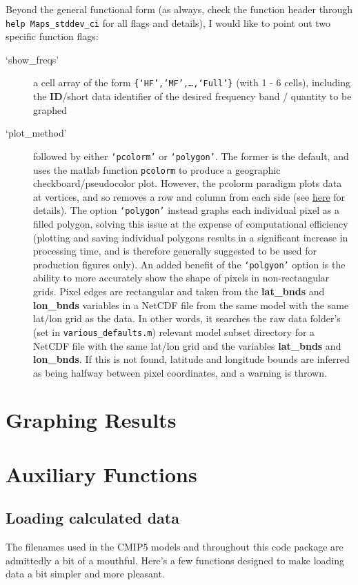\documentclass{article}
\begin{document}
Beyond the general functional form (as always, check the function header through \texttt{help Maps\_stddev\_ci} for all flags and details), I would like to point out two specific function flags:
\begin{description}
\item [`show\_freqs'] a cell array of the form \texttt{\{`HF',`MF',\dots,`Full'\}} (with 1 - 6 cells), including the \textbf{ID}/short data identifier of the desired frequency band / quantity to be graphed
\item [`plot\_method'] followed by either \texttt{`pcolorm'} or \texttt{`polygon'}. The former is the default, and uses the matlab function \texttt{pcolorm} to produce a geographic checkboard/pseudocolor plot. However, the pcolorm paradigm plots data at vertices, and so removes a row and column from each side (see \href{http://www.mathworks.com/matlabcentral/fileexchange/50706-offsets-and-missing-data-via-pcolor-and-surf?focused=3873981&tab=example}{\underline{here}} for details). The option \texttt{`polygon'} instead graphs each individual pixel as a filled polygon, solving this issue at the expense of computational efficiency (plotting and saving individual polygons results in a significant increase in processing time, and is therefore generally suggested to be used for production figures only). An added benefit of the \texttt{`polgyon'} option is the ability to more accurately show the shape of pixels in non-rectangular grids. Pixel edges are rectangular and taken from the \textbf{lat\_bnds} and \textbf{lon\_bnds} variables in a NetCDF file from the same model with the same lat/lon grid as the data. In other words, it searches the raw data folder's (set in \texttt{various\_defaults.m}) relevant model subset directory for a NetCDF file with the same lat/lon grid and the variables \textbf{lat\_bnds} and \textbf{lon\_bnds}. If this is not found, latitude and longitude bounds are inferred as being halfway between pixel coordinates, and a warning is thrown. 
\end{description}

\section{Graphing Results} %


\section{Auxiliary Functions} %
\subsection{Loading calculated data}
The filenames used in the CMIP5 models and throughout this code package are admittedly a bit of a mouthful. Here's a few functions designed to make loading data a bit simpler and more pleasant.
\end{document}
